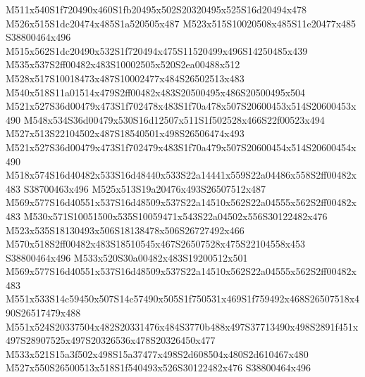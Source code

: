 \documentclass{article}
\begin{document}
\begin{multicols}{2}
M511x540S1f720490x460S1fb20495x502S20320495x525S16d20494x478 M526x515S1dc20474x485S1a520505x487 M523x515S10020508x485S11e20477x485 S38800464x496 M515x562S1dc20490x532S1f720494x475S11520499x496S14250485x439 M535x537S2ff00482x483S10002505x520S2ea00488x512 M528x517S10018473x487S10002477x484S26502513x483 M540x518S11a01514x479S2ff00482x483S20500495x486S20500495x504 M521x527S36d00479x473S1f702478x483S1f70a478x507S20600453x514S20600453x490 M548x534S36d00479x530S16d12507x511S1f502528x466S22f00523x494 M527x513S22104502x487S18540501x498S26506474x493 M521x527S36d00479x473S1f702479x483S1f70a479x507S20600454x514S20600454x490 M518x574S16d40482x533S16d48440x533S22a14441x559S22a04486x558S2ff00482x483 S38700463x496 M525x513S19a20476x493S26507512x487 M569x577S16d40551x537S16d48509x537S22a14510x562S22a04555x562S2ff00482x483 M530x571S10051500x535S10059471x543S22a04502x556S30122482x476 M523x535S18130493x506S18138478x506S26727492x466 M570x518S2ff00482x483S18510545x467S26507528x475S22104558x453 S38800464x496 M533x520S30a00482x483S19200512x501 M569x577S16d40551x537S16d48509x537S22a14510x562S22a04555x562S2ff00482x483 M551x533S14c59450x507S14c57490x505S1f750531x469S1f759492x468S26507518x490S26517479x488 M551x524S20337504x482S20331476x484S3770b488x497S37713490x498S2891f451x497S28907525x497S20326536x478S20326450x477 M533x521S15a3f502x498S15a37477x498S2d608504x480S2d610467x480 M527x550S26500513x518S1f540493x526S30122482x476 S38800464x496









\end{multicols}
\end{document}
